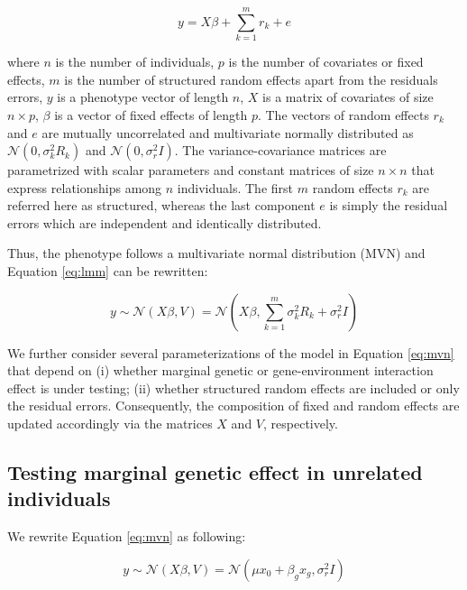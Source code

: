\documentclass[]{book}
\begin{document}
\begin{equation}
  y = X \beta + \sum_{k=1}^{m}{r_k} + e
\label{eq:lmm}
\end{equation}

where \(n\) is the number of individuals, \(p\) is the number of
covariates or fixed effects, \(m\) is the number of structured random
effects apart from the residuals errors, \(y\) is a phenotype vector of
length \(n\), \(X\) is a matrix of covariates of size \(n \times p\),
\(\beta\) is a vector of fixed effects of length \(p\). The vectors of
random effects \(r_k\) and \(e\) are mutually uncorrelated and
multivariate normally distributed as \(\mathcal{N}(0, \sigma^2_k R_k)\)
and \(\mathcal{N}(0, \sigma^2_r I)\). The variance-covariance matrices
are parametrized with scalar parameters and constant matrices of size
\(n \times n\) that express relationships among \(n\) individuals. The
first \(m\) random effects \(r_k\) are referred here as structured,
whereas the last component \(e\) is simply the residual errors which are
independent and identically distributed.

Thus, the phenotype follows a multivariate normal distribution (MVN) and
Equation \eqref{eq:lmm} can be rewritten:

\begin{equation}
  y \sim \mathcal{N} (X \beta, V) = \mathcal{N} (X \beta, \sum_{k=1}^{m}{\sigma_k^2 R_k} + \sigma_r^2 I) 
\label{eq:mvn}
\end{equation}

We further consider several parameterizations of the model in Equation
\eqref{eq:mvn} that depend on (i) whether marginal genetic or
gene-environment interaction effect is under testing; (ii) whether
structured random effects are included or only the residual errors.
Consequently, the composition of fixed and random effects are updated
accordingly via the matrices \(X\) and \(V\), respectively.

\subsection{Testing marginal genetic effect in unrelated
individuals}\label{lmg}

We rewrite Equation \eqref{eq:mvn} as following:

\begin{equation}
  y \sim \mathcal{N} (X \beta, V) = \mathcal{N} (\mu x_0 + \beta_g x_g, \sigma_r^2 I) 
\label{eq:lmg}
\end{equation}
\end{document}
